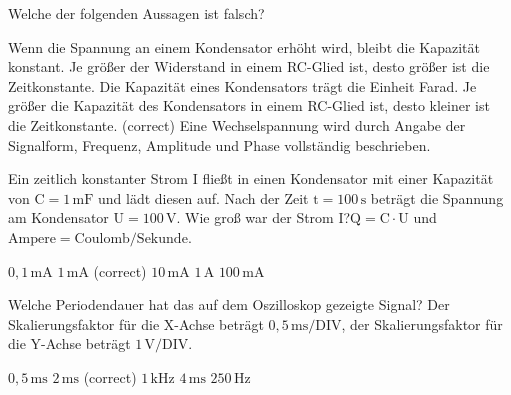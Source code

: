 \documentclass[11pt]{exam}
\begin{document}
\setlength{\voffset}{-0.5in}
\setlength{\headsep}{5pt}

\hspace{2mm}
 \hspace{5mm}
\vspace{4mm}

\begin{questions}

\question Welche der folgenden Aussagen ist falsch?

\begin{choices}
	\choice Wenn die Spannung an einem Kondensator erhöht wird, bleibt die Kapazität konstant.
	\choice Je größer der Widerstand in einem RC-Glied ist, desto größer ist die Zeitkonstante.
	\choice Die Kapazität eines Kondensators trägt die Einheit Farad.
	\choice Je größer die Kapazität des Kondensators in einem RC-Glied ist, desto kleiner ist die Zeitkonstante. (correct)
	\choice Eine Wechselspannung wird durch Angabe der Signalform, Frequenz, Amplitude und Phase vollständig beschrieben.
\end{choices}

\vspace{3mm}\question Ein zeitlich konstanter Strom \(\mathrm{I}\) fließt in einen Kondensator mit einer Kapazität von \(\mathrm{C=1\,mF}\) und lädt diesen auf. Nach der Zeit \(\mathrm{t=100\,s}\) beträgt die Spannung am Kondensator \(\mathrm{U=100\,V}\). Wie groß war der Strom \(\mathrm{I}\)?\(\mathrm{Q=C \cdot U}\) und \(\mathrm{Ampere=Coulomb/Sekunde}\).

\begin{choices}
	\choice \(\mathrm{0,1\,mA}\)
	\choice \(\mathrm{1\,mA}\) (correct)
	\choice \(\mathrm{10\,mA}\)
	\choice \(\mathrm{1\,A}\)
	\choice \(\mathrm{100\,mA}\)
\end{choices}

\vspace{3mm}\question Welche Periodendauer hat das auf dem Oszilloskop gezeigte Signal? Der Skalierungsfaktor für die X-Achse beträgt \(\mathrm{0,5\,ms/DIV}\), der Skalierungsfaktor für die Y-Achse beträgt \(\mathrm{1\,V/DIV}\).

\begin{choices}
	\choice \(\mathrm{0,5\,ms}\)
	\choice \(\mathrm{2\,ms}\) (correct)
	\choice \(\mathrm{1\,kHz}\)
	\choice \(\mathrm{4\,ms}\)
	\choice \(\mathrm{250\,Hz}\)
\end{choices}


\end{questions}
\end{document}
